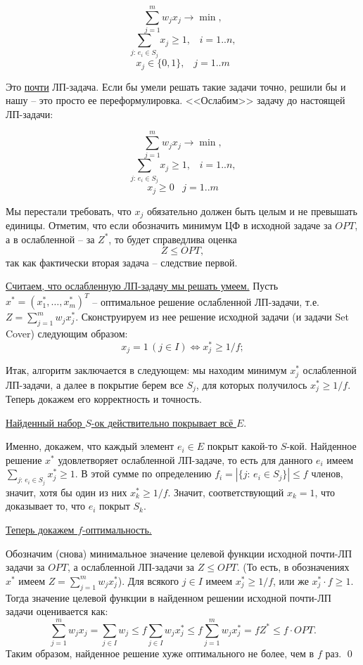 $$\sum_{j=1}^m w_j x_j \rightarrow \min,$$
$$\sum_{j:\, e_i \in S_j} x_j \geq 1, \;\;\; i=1..n,$$
$$x_j \in \{0, 1\}, \;\;\; j=1..m$$

Это \underline{почти} ЛП-задача. Если бы умели решать такие задачи точно, решили бы и нашу -- это просто ее переформулировка. <<Ослабим>> задачу до настоящей ЛП-задачи:

$$\sum_{j=1}^m w_j x_j \rightarrow \min,$$
$$\sum_{j:\, e_i \in S_j} x_j \geq 1, \;\;\; i=1..n,$$
$$x_j \geq 0 \;\;\; j=1..m$$

Мы перестали требовать, что $x_j$ обязательно должен быть целым и не превышать единицы. Отметим, что если обозначить минимум ЦФ в исходной задаче за $OPT$, а в ослабленной -- за $Z^*$, то будет справедлива оценка $$Z \leq OPT,$$ так как фактически вторая задача -- следствие первой.


\underline{Считаем, что ослабленную ЛП-задачу мы решать умеем.} Пусть $x^* = (x_1^*, \ldots, x_m^*)^T$ -- оптимальное решение ослабленной ЛП-задачи, т.е. $Z = \sum\limits_{j=1}^m w_j x_j^*$. Сконструируем из нее решение исходной задачи (и задачи Set Cover) следующим образом:
$$x_j = 1\, (j \in I) \iff x_j^* \geq 1/f;$$

Итак, алгоритм заключается в следующем: мы находим минимум $x_j^*$ ослабленной ЛП-задачи, а далее в покрытие берем все $S_j$, для которых получилось $x_j^* \geq 1/f$. Теперь докажем его корректность и точность.

\underline{Найденный набор $S$-ок действительно покрывает всё $E$}.

Именно, докажем, что каждый элемент $e_i \in E$ покрыт какой-то $S$-кой. Найденное решение $x^*$ удовлетворяет ослабленной ЛП-задаче, то есть для данного $e_i$ имеем $\sum\limits_{j: \, e_i \in S_j} x_j^* \geq 1$. В этой сумме по определению $f_i = \left|\{j: \, e_i \in S_j\}\right| \leq f$ членов, значит, хотя бы один из них $x_k^*\geq 1/f$. Значит, соответствующий $x_k = 1$, что доказывает то, что $e_i$ покрыт $S_k$.

\underline{Теперь докажем $f$-оптимальность.}

Обозначим (снова) минимальное значение целевой функции исходной почти-ЛП задачи за $OPT$, а ослабленной ЛП-задачи за $Z \leq OPT$.  (То есть, в обозначениях $x^*$ имеем $Z = \sum\limits_{j=1}^m w_j x_j^*$). Для всякого $j\in I$ имеем $x_j^* \geq 1/f$, или же $x_j^*\cdot f \geq 1$. Тогда значение целевой функции в найденном решении исходной почти-ЛП задачи оценивается как:
$$\sum_{j=1}^m w_j x_j = \sum_{j \in I} w_j \leq f \sum_{j \in I} w_j x_j^* \leq f \sum_{j=1}^m w_j x_j^* = f Z^* \leq f \cdot OPT.$$ Таким образом, найденное решение хуже оптимального не более, чем в $f$ раз. \qed

